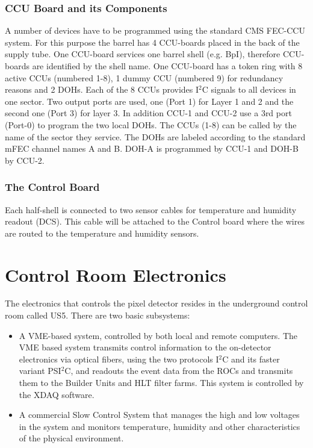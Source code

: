\documentclass{cmspaper}
\begin{document}
\subsubsection{CCU Board and its Components}

A number of devices have to be programmed using the 
standard CMS FEC-CCU system. For this purpose the barrel
has 4 CCU-boards placed in the back of the supply tube.
One CCU-board services one barrel shell (e.g. BpI),
therefore CCU-boards are identified by the shell
name.  
One CCU-board has a token ring with 8 active CCUs 
(numbered 1-8), 1 dummy CCU (numbered 9) for redundancy 
reasons and 2 DOHs. 
Each of the 8 CCUs provides I$^{2}$C signals to all devices in 
one sector.
Two output ports are used, one (Port 1) for Layer 1 and 2
and the second one (Port 3) for layer 3. In addition 
CCU-1 and CCU-2 use a 3rd port (Port-0) to program
the two local DOHs. 
The CCUs (1-8) can be called by the name of the sector 
they service. 
The DOHs are labeled 
according to the standard mFEC channel names A and B.
DOH-A is programmed by CCU-1 and DOH-B by CCU-2.   

\subsubsection{The Control Board}

Each half-shell is connected to two sensor cables for temperature and 
humidity readout (DCS). This cable will be attached
to the Control board where the wires are routed to
the temperature and humidity sensors. 

%


\section{Control Room Electronics}

The electronics that controls the pixel detector resides in the underground
control room called US5. 
There are two basic subsystems:
\begin{itemize}
\item A VME-based system, controlled by both local and remote computers.
The VME based system transmits control information to the on-detector 
electronics via optical fibers, using the two protocols I$^{2}$C and its faster variant PSI$^{2}$C,
and readouts the event data from the ROCs and transmits them 
to the Builder Units and HLT filter farms.
This system is controlled by the XDAQ software.
\item A commercial Slow Control System that manages the high and low voltages
in the system and monitors temperature, humidity and other characteristics
of the physical environment.
\end{itemize}
\end{document}
